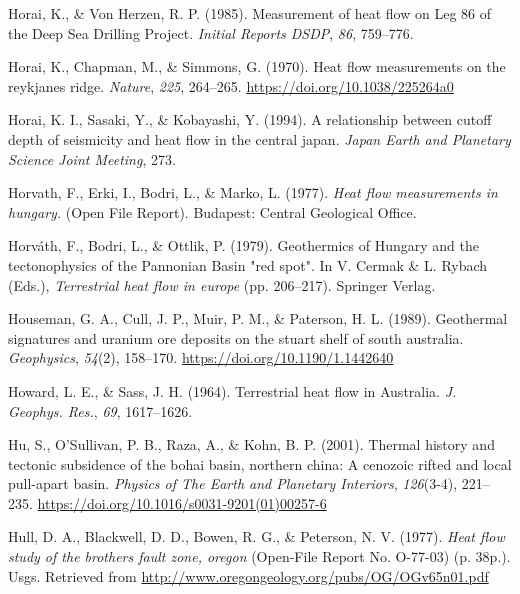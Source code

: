 \documentclass[draft,linenumbers]{agujournal2018}
\begin{document}
\leavevmode{}%
Horai, K., \& Von Herzen, R. P. (1985). Measurement of heat flow on
{Leg} 86 of the {Deep Sea Drilling Project}. \emph{Initial Reports
DSDP}, \emph{86}, 759--776.

\leavevmode{}%
Horai, K., Chapman, M., \& Simmons, G. (1970). Heat flow measurements on
the reykjanes ridge. \emph{{Nature}}, \emph{225}, 264--265.
\url{https://doi.org/10.1038/225264a0}

\leavevmode{}%
Horai, K. I., Sasaki, Y., \& Kobayashi, Y. (1994). A relationship
between cutoff depth of seismicity and heat flow in the central japan.
\emph{Japan Earth and Planetary Science Joint Meeting}, 273.

\leavevmode{}%
Horvath, F., Erki, I., Bodri, L., \& Marko, L. (1977). \emph{Heat flow
measurements in hungary.} (Open File Report). Budapest: Central
Geological Office.

\leavevmode{}%
Horváth, F., Bodri, L., \& Ottlik, P. (1979). Geothermics of {Hungary}
and the tectonophysics of the {Pannonian Basin} "red spot". In V. Cermak
\& L. Rybach (Eds.), \emph{Terrestrial heat flow in europe} (pp.
206--217). Springer Verlag.

\leavevmode{}%
Houseman, G. A., Cull, J. P., Muir, P. M., \& Paterson, H. L. (1989).
Geothermal signatures and uranium ore deposits on the stuart shelf of
south australia. \emph{{Geophysics}}, \emph{54}(2), 158--170.
\url{https://doi.org/10.1190/1.1442640}

\leavevmode{}%
Howard, L. E., \& Sass, J. H. (1964). Terrestrial heat flow in
{Australia}. \emph{J. Geophys. Res.}, \emph{69}, 1617--1626.

\leavevmode{}%
Hu, S., O'Sullivan, P. B., Raza, A., \& Kohn, B. P. (2001). Thermal
history and tectonic subsidence of the bohai basin, northern china: A
cenozoic rifted and local pull-apart basin. \emph{Physics of The Earth
and Planetary Interiors}, \emph{126}(3-4), 221--235.
\url{https://doi.org/10.1016/s0031-9201(01)00257-6}

\leavevmode{}%
Hull, D. A., Blackwell, D. D., Bowen, R. G., \& Peterson, N. V. (1977).
\emph{Heat flow study of the brothers fault zone, oregon} (Open-File
Report No. O-77-03) (p. 38p.). Usgs. Retrieved from
\url{http://www.oregongeology.org/pubs/OG/OGv65n01.pdf}
\end{document}
